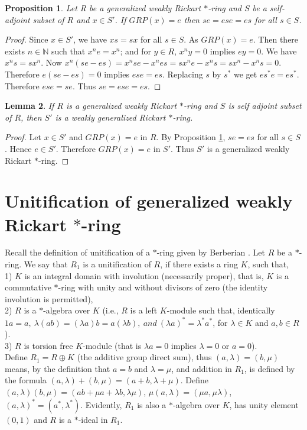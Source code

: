 \documentclass[11pt, one side,emlines]{amsart}
\newtheorem{lemma}{Lemma}[section]
\newtheorem{proposition}[lemma]{Proposition}
\theoremstyle{definition}
\numberwithin{equation}{section} \thispagestyle{empty} \voffset
\begin{document}
\begin{proposition} \label{s2pr13} Let R be a generalized weakly Rickart $*$-ring and $S$ be a self-adjoint subset of $R$ and $x\in S'$. If $GRP(x)=e$ then $ se=ese=es $ for all $ s\in S $.
\end{proposition}
\begin{proof}  Since $x\in S'$, we have $xs=sx$ for all $s\in S$.
	As $GRP(x)=e$. Then there exists  $ n\in\mathbb N$ such that  $x^ne=x^n$; and for $y \in R$, $x^ny=0$ implies $ey=0$. We have $x^ns=sx^n$. 
	Now $x^n(se-es)=x^nse-x^nes=sx^ne-x^ns=sx^n-x^ns=0$. Therefore $e(se-es)=0$ implies $ese=es$.
	Replacing $s$ by $s^*$ we get $es^*e=es^*$.
	Therefore  $ese=se$.
    Thus  $se=ese=es$.
\end{proof}

\begin{lemma} If $R$ is a generalized weakly Rickart $ *$-ring and $S$ is self adjoint subset of $R$, then $ S' $ is a weakly generalized Rickart $ *$-ring.
\end{lemma}
\begin{proof} Let $ x\in S' $ and $GRP(x)=e $ in $R$.
	By Proposition \ref{s2pr13}, $se=es$ for all $ s\in S$.
	Hence $e\in S'$.
	Therefore  $GRP(x)=e $ in $S'$. Thus $S'$ is a generalized weakly Rickart $*$-ring.
\end{proof}
 
 
 \section{Unitification of generalized weakly Rickart $*$-ring}
 
  
 Recall the definition of unitification of a $*$-ring given by Berberian \cite{Ber}.
 Let $R$ be a $*$-ring. We say that $R_1$ is a unitification of $R$, if there exists a  ring $K$, such that,\\
 1) $K$ is an integral domain with involution (necessarily
 proper), that is, $K$ is a commutative $*$-ring with unity
 and without divisors of zero (the identity involution is
 permitted),\\
 2) $R$ is a $*$-algebra over $K$ (i.e., $R$ is a left $K$-module such that,
 identically
 $1a=a,~\lambda (ab)=(\lambda a)b=a (\lambda b),~ and~(\lambda a)^*=\lambda ^*
 a^*$, for $\lambda \in K$ and $a,b \in R$).\\
 3) $R$ is torsion free $K$-module (that is $\lambda a=0$ implies $\lambda =0 $ or $a=0$).\\
 Define $R_1=R \oplus K$ (the additive group direct sum), thus
 $(a, \lambda)=(b, \mu)$ means, by the definition that $a=b$ and $\lambda
 =\mu$, and addition in $R_1$, is defined by the formula $(a, \lambda)+(b, \mu)=(a+b, \lambda +
 \mu)$. Define  $(a, \lambda)(b, \mu)=(ab+ \mu a+ \lambda b, \lambda
 \mu)$, $\mu (a, \lambda)=(\mu a, \mu \lambda)$, $(a, \lambda)^*=(a^*, \lambda
 ^*)$. Evidently, $R_1$ is also a $*$-algebra over $K$, has unity
 element $(0, 1)$ and $R$ is a
 $*$-ideal in $R_1$.
  
\end{document}

